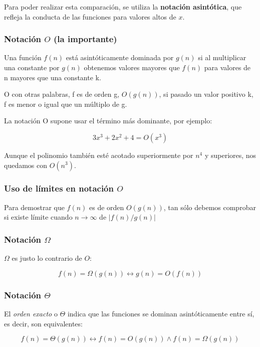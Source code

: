 \documentclass[11pt,a4paper]{article}
\begin{document}
\medskip

Para poder realizar esta comparación, se utiliza la \textbf{notación asintótica}, que refleja la conducta de las funciones para valores altos de $x$.

\subsubsection*{Notación $O$ (la importante)}

Una función $f(n)$ está asintóticamente dominada por $g(n)$ si al multiplicar una constante por $g(n)$ obtenemos valores mayores que $f(n)$ para valores de n mayores que una constante k.

O con otras palabras, f es de orden g, $O(g(n))$, si pasado un valor positivo k, f es menor o igual que un múltiplo de g.

\medskip

La notación O supone usar el término más dominante, por ejemplo:

$$3x^{3} + 2x^{2} + 4 = O(x^{3})$$

Aunque el polinomio también esté acotado superiormente por $n^{4}$ y superiores, nos quedamos con $O(n^{3})$.

\subsubsection*{Uso de límites en notación $O$}

Para demostrar que $f(n)$ es de orden $O(g(n))$, tan sólo debemos comprobar si existe límite cuando $n\rightarrow \infty$ de $|f(n)/g(n)|$


\subsubsection*{Notación $\Omega$}

$\Omega$ es justo lo contrario de $O$:

$$f(n) = \Omega(g(n)) \leftrightarrow g(n) = O(f(n))$$

\subsubsection*{Notación $\Theta$}

El \textit{orden exacto} o $\Theta$ indica que las funciones se dominan asintóticamente entre sí, es decir, son equivalentes:

$$f(n) = \Theta(g(n)) \leftrightarrow f(n) = O(g(n)) \wedge f(n) = \Omega(g(n))$$
\end{document}
